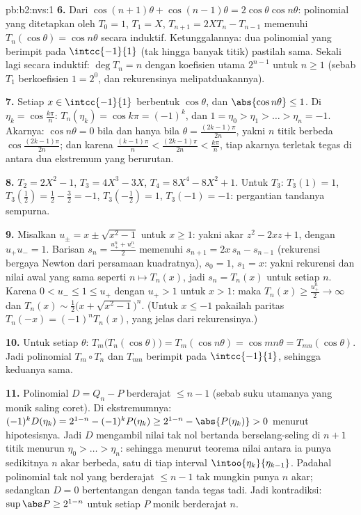 \begin{solution}{pb:b2:nvs:1}
\textbf{6.} Dari $\cos(n{+}1)\theta + \cos(n{-}1)\theta =
2\cos\theta\cos n\theta$: polinomial yang ditetapkan oleh $T_0 = 1$,
$T_1 = X$, $T_{n+1} = 2XT_n - T_{n-1}$ memenuhi $T_n(\cos\theta)
= \cos n\theta$ secara induktif. Ketunggalannya: dua polinomial yang
berimpit pada $\intcc{-1}{1}$ (tak hingga banyak titik) pastilah sama.
Sekali lagi secara induktif: $\deg T_n = n$ dengan koefisien utama
$2^{n-1}$ untuk $n \geq 1$ (sebab $T_1$ berkoefisien $1 = 2^0$, dan
rekurensinya melipatduakannya).

\textbf{7.} Setiap $x \in \intcc{-1}{1}$ berbentuk $\cos\theta$, dan
$\abs{\cos n\theta} \leq 1$. Di $\eta_k = \cos\frac{k\pi}n$:
$T_n(\eta_k) = \cos k\pi = (-1)^k$, dan $1 = \eta_0 > \eta_1 >
\dots > \eta_n = -1$. Akarnya: $\cos n\theta = 0$ bila dan hanya bila
$\theta = \frac{(2k-1)\pi}{2n}$, yakni $n$ titik berbeda
$\cos\frac{(2k-1)\pi}{2n}$; dan karena $\frac{(k-1)\pi}n <
\frac{(2k-1)\pi}{2n} < \frac{k\pi}n$, tiap akarnya terletak tegas
di antara dua ekstremum yang berurutan.

\textbf{8.} $T_2 = 2X^2 - 1$, $T_3 = 4X^3 - 3X$, $T_4 = 8X^4 -
8X^2 + 1$. Untuk $T_3$: $T_3(1) = 1$, $T_3(\tfrac12) = \tfrac12 -
\tfrac32 = -1$, $T_3(-\tfrac12) = 1$, $T_3(-1) = -1$: pergantian
tandanya sempurna.

\textbf{9.} Misalkan $u_\pm = x \pm \sqrt{x^2 - 1}$ untuk $x \geq 1$:
yakni akar $z^2 - 2xz + 1$, dengan $u_+u_- = 1$. Barisan
$s_n = \frac{u_+^n + u_-^n}2$ memenuhi $s_{n+1} = 2x\,s_n -
s_{n-1}$ (rekurensi bergaya Newton dari persamaan kuadratnya), $s_0 = 1$,
$s_1 = x$: yakni rekurensi dan nilai awal yang sama seperti $n \mapsto
T_n(x)$, jadi $s_n = T_n(x)$ untuk setiap $n$. Karena $0 < u_- \leq 1
\leq u_+$ dengan $u_+ > 1$ untuk $x > 1$: maka $T_n(x) \geq
\frac{u_+^n}2 \to \infty$ dan $T_n(x) \sim \frac12\bigl(x +
\sqrt{x^2-1}\bigr)^n$. (Untuk $x \leq -1$ pakailah paritas $T_n(-x)
= (-1)^nT_n(x)$, yang jelas dari rekurensinya.)

\textbf{10.} Untuk setiap $\theta$: $T_m\bigl(T_n(\cos\theta)\bigr)
= T_m(\cos n\theta) = \cos mn\theta =
T_{mn}(\cos\theta)$. Jadi polinomial $T_m \circ T_n$ dan
$T_{mn}$ berimpit pada $\intcc{-1}{1}$, sehingga keduanya sama.

\textbf{11.} Polinomial $D = Q_n - P$ berderajat $\leq n - 1$ (sebab suku
utamanya yang monik saling coret). Di ekstremumnya: $(-1)^kD(\eta_k) =
2^{1-n} - (-1)^kP(\eta_k) \geq 2^{1-n} - \abs{P(\eta_k)} > 0$ menurut
hipotesisnya. Jadi $D$ mengambil nilai tak nol bertanda berselang-seling
di $n + 1$ titik menurun $\eta_0 > \dots > \eta_n$: sehingga menurut
teorema nilai antara ia punya sedikitnya $n$ akar berbeda,
satu di tiap interval  $\intoo{\eta_{k}}{\eta_{k-1}}$. Padahal
polinomial tak nol yang berderajat $\leq n - 1$ tak mungkin punya $n$ akar;
sedangkan $D = 0$ bertentangan dengan tanda tegas tadi. Jadi
kontradiksi: $\sup\abs P \geq 2^{1-n}$ untuk setiap $P$ monik berderajat $n$.


\end{solution}
